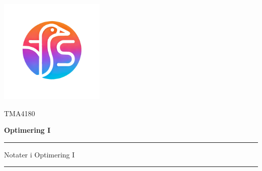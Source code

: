 \begin{titlepage}
    \newcommand{\HRule}{\rule{\linewidth}{0.5mm}}
    \center
    
    \vspace*{2cm}
    \begin{center}
        \includegraphics[width=5cm]{preamble/frontmatter/TS_GooseLogo.png}
    \end{center}
    
    \vspace{2cm}
    
    {\color{ntnu-blue}\sffamily\LARGE TMA4180 \par}
    \vspace{0.8cm}
    {\sffamily\huge\bfseries\color{black} Optimering I \par}
    
    \vspace{1.5cm}
    
    {\color{ntnu-lightblue}\HRule}
    \vspace{0.75cm}
    {\Large\sffamily\color{ntnu-blue} Notater i Optimering I \par}
    \vspace{0.75cm}
    {\color{ntnu-lightblue}\HRule}
    
    \vspace{2cm}
    

\end{titlepage}

